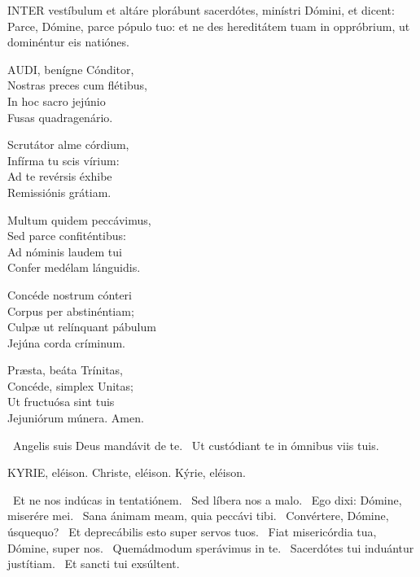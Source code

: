 

\lettrine[lines=2]{I}{NTER} vestíbulum et altáre plorábunt sacerdótes, minístri Dómini, et dicent: Parce, Dómine, parce pópulo tuo: et ne des hereditátem tuam in oppróbrium, ut dominéntur eis natiónes.


\lettrine[lines=2]{A}{UDI}, benígne Cónditor,\\
Nostras preces cum flétibus,\\
In hoc sacro jejúnio\\
Fusas quadragenário.

Scrutátor alme córdium,\\
Infírma tu scis vírium:\\
Ad te revérsis éxhibe\\
Remissiónis grátiam.

Multum quidem peccávimus,\\
Sed parce confiténtibus:\\
Ad nóminis laudem tui\\
Confer medélam lánguidis.

Concéde nostrum cónteri\\
Corpus per abstinéntiam;\\
Culpæ ut relínquant pábulum\\
Jejúna corda críminum.

Præsta, beáta Trínitas,\\
Concéde, simplex Unitas;\\
Ut fructuósa sint tuis\\
Jejuniórum múnera. Amen.

\V\ Angelis suis Deus mandávit de te. \R\ Ut custódiant te in ómnibus viis tuis.




KYRIE, eléison. Christe, eléison. Kýrie, eléison.

 \V\ Et ne nos indúcas in tentatiónem. \R\ Sed líbera nos a malo. \V\ Ego dixi: Dómine, miserére mei. \R\ Sana ánimam meam, quia peccávi tibi. \V\ Convértere, Dómine, úsquequo? \R\ Et deprecábilis esto super servos tuos. \V\ Fiat misericórdia tua, Dómine, super nos. \R\ Quemádmodum sperávimus in te. \V\ Sacerdótes tui induántur justítiam. \R\ Et sancti tui exsúltent.

